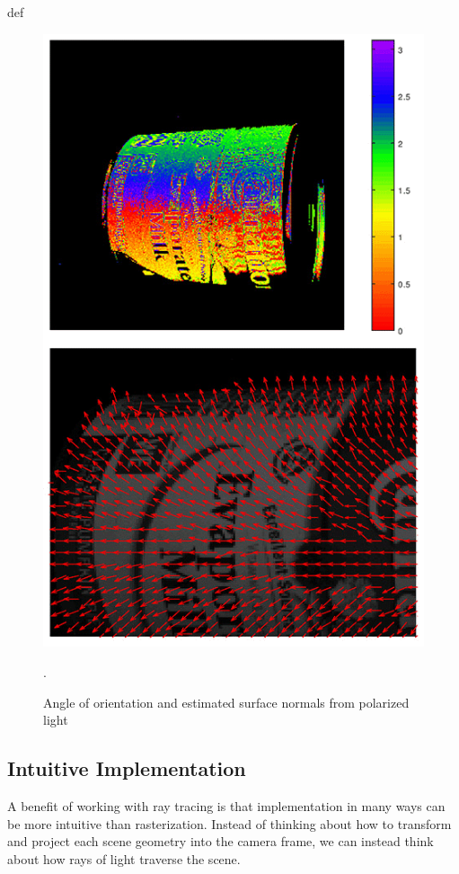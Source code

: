 def
\begin{figure}
    \centering
    \includegraphics[width=\linewidth]{images/polarization_normals.png}
    \caption{Angle of orientation and estimated surface normals from polarized light \cite{lucidvisionlabs3DDepthSurface2021}}.
    \label{fig:polarization}
\end{figure}


\subsection{Intuitive Implementation}
A benefit of working with ray tracing is that implementation in many ways can be more intuitive than rasterization.
Instead of thinking about how to transform and project each scene geometry into the camera frame, we can instead think about how rays of light traverse the scene.

